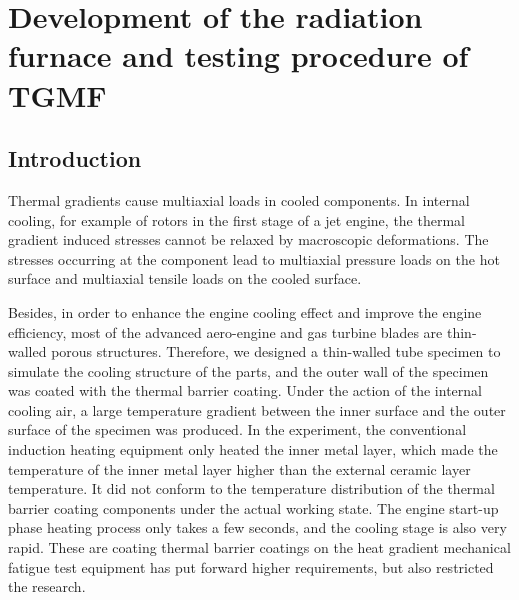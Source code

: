\chapter{Development of the radiation furnace and testing procedure of TGMF}
\section{Introduction}
\noindent
Thermal gradients cause multiaxial loads in cooled components.
In internal cooling, for example of rotors in the first stage of a jet engine, the thermal gradient induced stresses cannot be relaxed by macroscopic deformations.
The stresses occurring at the component lead to multiaxial pressure loads on the hot surface and multiaxial tensile loads on the cooled surface.

Besides, in order to enhance the engine cooling effect and improve the engine efficiency, most of the advanced aero-engine and gas turbine blades are thin-walled porous structures.
Therefore, we designed a thin-walled tube specimen to simulate the cooling structure of the parts, and the outer wall of the specimen was coated with the thermal barrier coating.
Under the action of the internal cooling air, a large temperature gradient between the inner surface and the outer surface of the specimen was produced.
In the experiment, the conventional induction heating equipment only heated the inner metal layer, which made the temperature of the inner metal layer higher than the external ceramic layer temperature. It did not conform to the temperature distribution of the thermal barrier coating components under the actual working state.
The engine start-up phase heating process only takes a few seconds, and the cooling stage is also very rapid. These are coating thermal barrier coatings on the heat gradient mechanical fatigue test equipment has put forward higher requirements, but also restricted the research.

